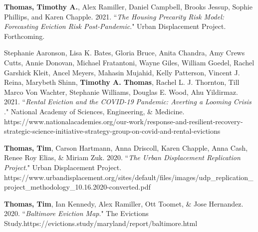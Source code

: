 


\begin{cvparagraph}

\textbf{Thomas, Timothy A.}, Alex Ramiller, Daniel Campbell, Brooks Jessup, Sophie Phillips, and Karen Chapple. 2021. “\emph{The Housing Precarity Risk Model: Forecasting Eviction Risk Post-Pandemic}." Urban Displacement Project. Forthcoming.
\end{cvparagraph}


\begin{cvparagraph}

Stephanie Aaronson, Lisa K. Bates, Gloria Bruce, Anita Chandra, Amy Crews Cutts, Annie Donovan, Michael Fratantoni, Wayne Giles, William Goedel, Rachel Garshick Kleit, Ancel Meyers, Mahasin Mujahid, Kelly Patterson, Vincent J. Reina, Marybeth Shinn, \textbf{Timothy A. Thomas}, Rachel L. J. Thornton, Till Marco Von Wachter, Stephanie Williams, Douglas E. Wood, Ahu Yildirmaz. 2021. “\emph{Rental Eviction and the COVID-19 Pandemic: Averting a Looming Crisis}
." National Academy of Sciences, Engineering, \& Medicine. https://www.nationalacademies.org/our-work/response-and-resilient-recovery-strategic-science-initiative-strategy-group-on-covid-and-rental-evictions
\end{cvparagraph}

\begin{cvparagraph}

\textbf{Thomas, Tim}, Carson Hartmann, Anna Driscoll, Karen Chapple, Anna Cash, Renee Roy Elias, \& Miriam Zuk. 2020. “\emph{The Urban Displacement Replication Project}." Urban Displacement Project. https://www.urbandisplacement.org/sites/default/files/images/\newline udp\_replication\_project\_methodology\_10.16.2020-converted.pdf
\end{cvparagraph}

\begin{cvparagraph}

\textbf{Thomas, Tim}, Ian Kennedy, Alex Ramiller, Ott Toomet, \& Jose Hernandez. 2020. “\emph{Baltimore Eviction Map}." The Evictions Study.\newline https://evictions.study/maryland/report/baltimore.html
\end{cvparagraph}


